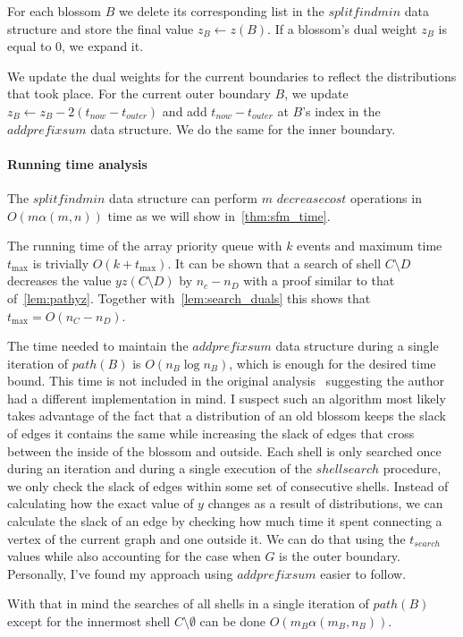 For each blossom $B$ we delete its corresponding list in the $splitfindmin$ data structure and store the final value $z_B \gets z(B)$. If a blossom's dual weight $z_B$ is equal to $0$, we expand it.

We update the dual weights for the current boundaries to reflect the distributions that took place. For the current outer boundary $B$, we update $z_B \gets z_B - 2(t_{now} - t_{outer})$ and add $t_{now} - t_{outer}$ at $B$'s index in the $addprefixsum$ data structure. We do the same for the inner boundary.

\paragraph*{Running time analysis} The $splitfindmin$ data structure can perform $m$ $decreasecost$ operations in $O(m\alpha(m,n))$ time as we will show in~\ref{thm:sfm_time}.

The running time of the array priority queue with $k$ events and maximum time $t_{\max}$ is trivially $O(k + t_{\max})$. It can be shown that a search of shell $C \setminus D$ decreases the value $yz(C \setminus D)$ by $n_c - n_D$ with a proof similar to that of~\ref{lem:pathyz}. Together with~\ref{lem:search_duals} this shows that $t_{\max} = O(n_C - n_D)$. 

The time needed to maintain the $addprefixsum$ data structure during a single iteration of $path(B)$ is $O(n_B \log n_B)$, which is enough for the desired time bound. This time is not included in the original analysis~\cite{gabow1984scaling} suggesting the author had a different implementation in mind. I suspect such an algorithm most likely takes advantage of the fact that a distribution of an old blossom keeps the slack of edges it contains the same while increasing the slack of edges that cross between the inside of the blossom and outside. Each shell is only searched once during an iteration and during a single execution of the $shellsearch$ procedure, we only check the slack of edges within some set of consecutive shells. Instead of calculating how the exact value of $y$ changes as a result of distributions, we can calculate the slack of an edge by checking how much time it spent connecting a vertex of the current graph and one outside it. We can do that using the $t_{search}$ values while also accounting for the case when $G$ is the outer boundary. Personally, I've found my approach using $addprefixsum$ easier to follow.

With that in mind the searches of all shells in a single iteration of $path(B)$ except for the innermost shell $C \setminus \emptyset$ can be done $O(m_B \alpha(m_B, n_B))$. 

